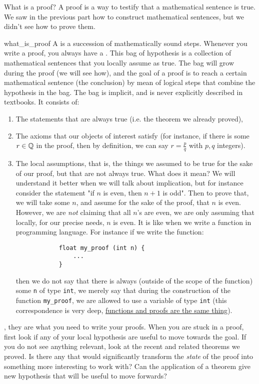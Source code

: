 What is a proof? A proof is a way to testify that a mathematical sentence is true. We saw in the previous part how to construct mathematical sentences, but we didn't see how to prove them.
\begin{cdef}{}{what_is_proof}
    A  is a succession of mathematically sound steps. Whenever you write a proof, you always have a . This bag of hypothesis is a collection of mathematical sentences that you locally assume as true. The bag will grow during the proof (we will see how), and the goal of a proof is to reach a certain mathematical sentence (the conclusion) by mean of logical steps that combine the hypothesis in the bag. The bag is implicit, and is never explicitly described in textbooks. It consists of:
    \begin{enumerate}
        \item The statements that are always true (i.e. the theorem we already proved),
        \item The axioms that our objects of interest satisfy (for instance, if there is some \( r \in \mathbb{Q} \) in the proof, then by definition, we can say \( r = \frac p q \) with \( p, q \) integers).
        \item The local assumptions, that is, the things we assumed to be true for the sake of our proof, but that are not always true. What does it mean? We will understand it better when we will talk about implication, but for instance consider the statement "if \( n \) is even, then \( n + 1 \) is odd". Then to prove that, we will take some \( n \), and assume for the sake of the proof, that \( n \) is even. However, we are \textit{not} claiming that all \( n \)'s are even, we are only assuming that locally, for our precise needs, \( n \) is even. It is like when we write a function in programming language. For instance if we write the function:
        \begin{verbatim}
            float my_proof (int n) {
                ...
            }
        \end{verbatim} 
        then we do not say that there is always (outside of the scope of the function) some \verb|n| of type \verb|int|, we merely say that during the construction of the function \verb|my_proof|, we are allowed to use a variable of type \verb|int| (this correspondence is very deep, \href{https://en.wikipedia.org/wiki/Curry%E2%80%93Howard_correspondence}{functions and proofs are the same thing}). 
    \end{enumerate}
\end{cdef}
, they are what you need to write your proofs. When you are stuck in a proof, first look if any of your local hypothesis are useful to move towards the goal. If you do not see anything relevant, look at the recent and related theorems we proved. Is there any that would significantly transform the \textit{state} of the proof into something more interesting to work with? Can the application of a theorem give new hypothesis that will be useful to move forwards?

